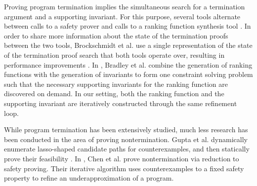 \documentclass[preprint]{sigplanconf}
\theoremstyle{definition}
\begin{document}
Proving program termination implies the simultaneous search for a
termination argument and a supporting invariant.  For this purpose, several
tools alternate between calls to a safety prover and calls to a ranking
function synthesis tool \cite{}.  In order to share more information about
the state of the termination proofs between the two tools, Brockschmidt et
al.  use a single representation of the state of the termination proof
search that both tools operate over, resulting in performance improvements
\cite{DBLP:conf/cav/BrockschmidtCF13}.  In \cite{DBLP:conf/cav/BradleyMS05},
Bradley et al.  combine the generation of ranking functions with the
generation of invariants to form one constraint solving problem such that
the necessary supporting invariants for the ranking function are discovered
on demand.  In our setting, both the ranking function and the supporting
invariant are iteratively constructed through the same refinement loop.

 






While program termination has been extensively studied, much less research has been conducted in the area of proving nontermination.
Gupta et al. dynamically enumerate lasso-shaped candidate
paths for counterexamples, and then statically prove their feasibility \cite{DBLP:conf/popl/GuptaHMRX08}. 
In \cite{DBLP:conf/tacas/ChenCFNO14}, Chen et al. prove nontermination via
reduction to safety proving. Their iterative algorithm uses counterexamples to a fixed safety property
to refine an underapproximation of a program. 

 


{}
\end{document}
